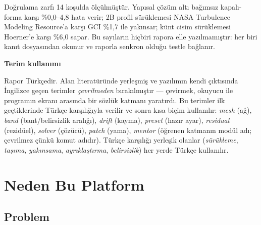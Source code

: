\documentclass[11pt,a4paper]{article}
\newcommand{\kkkenar}{lacivert}
\newcommand{\kkzemin}{kod}
\newenvironment{renkkutu}[3]{%
  \renewcommand{\kkkenar}{#1}\renewcommand{\kkzemin}{#2}%
  \par\medskip\noindent
  \begin{lrbox}{\kutugovde}%
  \begin{minipage}{\dimexpr\linewidth-2\fboxsep-2\fboxrule\relax}\footnotesize
  \textcolor{#1}{\textbf{#3}}\par\vspace{3pt}%
}{%
  \end{minipage}%
  \end{lrbox}%
  \noindent\fcolorbox{\kkkenar}{\kkzemin}{\usebox{\kutugovde}}%
  \par\medskip
}
\newenvironment{anafikir}[1]{\begin{renkkutu}{lacivert}{kod}{#1}}{\end{renkkutu}}
\begin{document}
Doğrulama zarfı 14 koşulda ölçülmüştür. Yapısal çözüm altı bağımsız kapalı-forma
karşı \%0{,}0--4{,}8 hata verir; 2B profil sürüklemesi NASA Turbulence Modeling
Resource'a karşı GCI \%1{,}7 ile yakınsar; künt cisim sürüklemesi Hoerner'e
karşı \%6{,}0 sapar. Bu sayıların hiçbiri rapora elle yazılmamıştır: her biri
kanıt dosyasından okunur ve raporla senkron olduğu testle bağlanır.

\begin{anafikir}{Terim kullanımı}
Rapor Türkçedir. Alan literatüründe yerleşmiş ve yazılımın kendi çıktısında
İngilizce geçen terimler \emph{çevrilmeden} bırakılmıştır --- çevirmek, okuyucu
ile programın ekranı arasında bir sözlük katmanı yaratırdı. Bu terimler ilk
geçtiklerinde Türkçe karşılığıyla verilir ve sonra kısa biçim kullanılır:
\emph{mesh} (ağ), \emph{band} (bant/belirsizlik aralığı), \emph{drift}
(kayma), \emph{preset} (hazır ayar), \emph{residual} (rezidüel), \emph{solver}
(çözücü), \emph{patch} (yama), \emph{mentor} (öğrenen katmanın modül adı;
çevrilmez çünkü komut adıdır). Türkçe karşılığı yerleşik olanlar
(\emph{sürükleme}, \emph{taşıma}, \emph{yakınsama}, \emph{ayrıklaştırma},
\emph{belirsizlik}) her yerde Türkçe kullanılır.
\end{anafikir}

{\setlength{\parskip}{0pt}
\renewcommand{\contentsname}{\normalsize İçindekiler}
\setcounter{tocdepth}{1}
\tableofcontents}

\vspace{2mm}

\section{Neden Bu Platform}

\subsection*{Problem}
\end{document}

